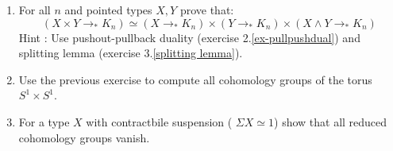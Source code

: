 \documentclass[10pt,oneside,leqno,openright]{memoir}
\begin{document}
\begin{enumerate}
\begin{enumerate}
  \item Show that $f$ is surjective if and only if $\inr $ is.
  \item Show that the pushout of an embedding is an embedding, i.e., if $f$ is $(-1)$-truncated, then so is $\inr$ in the pushout square.(Hint: Use flattening lemma stated in exercise 3.\ref{flattening})
  \end{enumerate}
  \item For all $n$ and pointed types $X ,Y $ prove that:
  $$
  (X \times Y \to_* K_n ) \simeq (X \to_* K_n) \times (Y \to_* K_n) \times ( X \land Y \to_* K_n)
  $$
  Hint : Use pushout-pullback duality (exercise 2.\ref{ex-pullpushdual}) and splitting lemma (exercise $3.$\ref{splitting lemma}).
   \item Use the previous exercise to compute all cohomology groups of the torus $S^1 \times S^1$. 
   \item  For a type $X$ with contractbile suspension ( $\Sigma X \simeq 1$) show that all reduced cohomology groups vanish. \end{enumerate}


\raggedright
\end{document}
